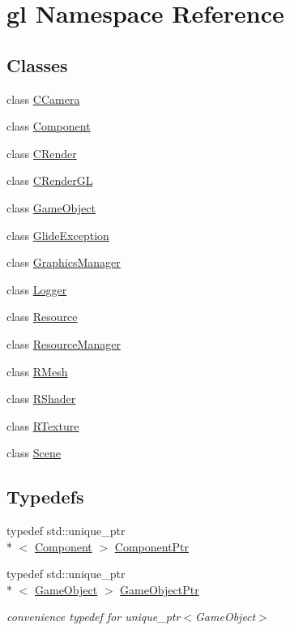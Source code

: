 \hypertarget{namespacegl}{\section{gl Namespace Reference}
\label{namespacegl}
}
\subsection*{Classes}
\begin{DoxyCompactItemize}
\item 
class \hyperlink{classgl_1_1_c_camera}{C\-Camera}
\item 
class \hyperlink{classgl_1_1_component}{Component}
\item 
class \hyperlink{classgl_1_1_c_render}{C\-Render}
\item 
class \hyperlink{classgl_1_1_c_render_g_l}{C\-Render\-G\-L}
\item 
class \hyperlink{classgl_1_1_game_object}{Game\-Object}
\item 
class \hyperlink{classgl_1_1_glide_exception}{Glide\-Exception}
\item 
class \hyperlink{classgl_1_1_graphics_manager}{Graphics\-Manager}
\item 
class \hyperlink{classgl_1_1_logger}{Logger}
\item 
class \hyperlink{classgl_1_1_resource}{Resource}
\item 
class \hyperlink{classgl_1_1_resource_manager}{Resource\-Manager}
\item 
class \hyperlink{classgl_1_1_r_mesh}{R\-Mesh}
\item 
class \hyperlink{classgl_1_1_r_shader}{R\-Shader}
\item 
class \hyperlink{classgl_1_1_r_texture}{R\-Texture}
\item 
class \hyperlink{classgl_1_1_scene}{Scene}
\end{DoxyCompactItemize}
\subsection*{Typedefs}
\begin{DoxyCompactItemize}
\item 
typedef std\-::unique\-\_\-ptr\\*
$<$ \hyperlink{classgl_1_1_component}{Component} $>$ \hyperlink{namespacegl_a2cd59688c30d8f0b1168a93aa4bffbcc}{Component\-Ptr}
\item 
typedef std\-::unique\-\_\-ptr\\*
$<$ \hyperlink{classgl_1_1_game_object}{Game\-Object} $>$ \hyperlink{namespacegl_a4caed01d7776fc4f8768dbf8d88d0388}{Game\-Object\-Ptr}
\begin{DoxyCompactList}\small\item\em convenience typedef for unique\-\_\-ptr$<$\-Game\-Object$>$ \end{DoxyCompactList}\end{DoxyCompactItemize}
